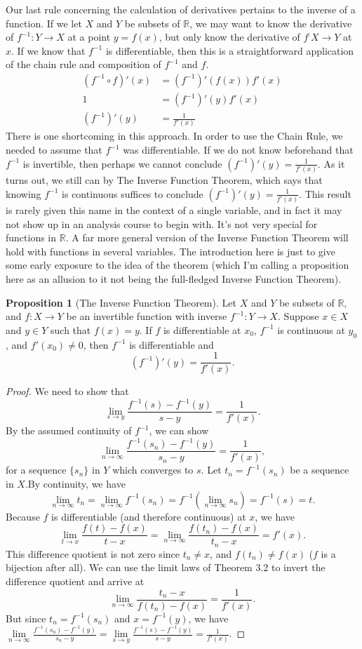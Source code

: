 \documentclass{article}
\newcommand{\R}{\mathbb{R}}
\theoremstyle{definition}
\newtheorem{proposition}{Proposition}[section]
\begin{document}
	Our last rule concerning the calculation of derivatives pertains to the inverse of a function. If we let $ X $ and $ Y $ be subsets of $ \R $, we may want to know the derivative of $ f^{-1}:Y\to X $ at a point $ y=f(x) $, but only know the derivative of $ f^:X\to Y $ at $ x $. If we know that $ f^{-1} $ is differentiable, then this is a straightforward application of the chain rule and composition of $ f^{-1} $ and $ f $. 
	\begin{align*}
		(f^{-1}\circ f)'(x)&=(f^{-1})'(f(x))f'(x)\\
		1&=(f^{-1})'(y)f'(x)\\
		(f^{-1})'(y)&=\frac{1}{f'(x)}
	\end{align*} 
	There is one shortcoming in this approach. In order to use the Chain Rule, we needed to assume that $ f^{-1} $ was differentiable. If we do not know beforehand that $ f^{-1} $ is invertible, then perhaps we cannot conclude $ (f^{-1})'(y)=\frac{1}{f'(x)}  $. As it turns out, we still can by The Inverse Function Theorem, which says that knowing $ f^{-1} $ is continuous suffices to conclude $ (f^{-1})'(y)=\frac{1}{f'(x)}  $. This result is rarely given this name in the context of a single variable, and in fact it may not show up in an analysis course to begin with. It's not very special for functions in $ \R $. A far more general version of the Inverse Function Theorem will hold with functions in several variables. The introduction here is just to give some early exposure to the idea of the theorem (which I'm calling a proposition here as an allusion to it not being the full-fledged Inverse Function Theorem).  
	\begin{proposition}[The Inverse Function Theorem]
		Let $ X $ and $ Y $ be subsets of $ \R $, and $ f:X\to Y $ be an invertible function with inverse $ f^{-1}:Y\to X $. Suppose $ x\in X $ and $ y\in Y $ such that $ f(x)=y $. If $ f $ is differentiable at $ x_0 $, $ f^{-1} $ is continuous at $ y_0 $, and $ f'(x_0)\neq 0 $, then $ f^{-1} $ is differentiable and $$ (f^{-1})'(y)=\frac{1}{f'(x)}.$$
	\end{proposition}
	\begin{proof}
		We need to show that $$\lim\limits_{s\to y}\frac{f^{-1}(s)-f^{-1}(y)}{s-y}=\frac{1}{f'(x)} .$$ By the assumed continuity of $ f^{-1} $, we can show  $$\lim\limits_{n\to \infty}\frac{f^{-1}(s_n)-f^{-1}(y)}{s_n-y}=\frac{1}{f'(x)},$$ for a sequence $ \{s_n\} $ in $ Y $ which converges to $ s $. Let $ t_n=f^{-1}(s_n) $ be a sequence in $ X $.By continuity, we have $$\lim_{n\to\infty} t_n=\lim_{n\to\infty} f^{-1}(s_n)=  f^{-1}\left(\lim_{n\to\infty}s_n \right)=f^{-1}(s)=t.$$ Because $ f $ is differentiable (and therefore continuous) at $ x $, we have $$\lim\limits_{t\to x}\frac{f(t)-f(x)}{t-x}=\lim_{n\to\infty}\frac{f(t_n)-f(x)}{t_n-x}=f'(x) .$$ This difference quotient is not zero since $ t_n\neq x $, and $ f(t_n)\neq f(x) $ ($ f $ is a bijection after all). We can use the limit laws of Theorem 3.2 to invert the difference quotient and arrive at $$ \lim_{n\to\infty}\frac{t_n-x}{f(t_n)-f(x)}=\frac{1}{f'(x)}.$$ But since $  t_n=f^{-1}(s_n) $ and $ x=f^{-1}(y) $, we have $ \lim\limits_{n\to \infty}\frac{f^{-1}(s_n)-f^{-1}(y)}{s_n-y}=\lim\limits_{s\to y}\frac{f^{-1}(s)-f^{-1}(y)}{s-y}=\frac{1}{f'(x)} .$
	\end{proof}
\end{document}
